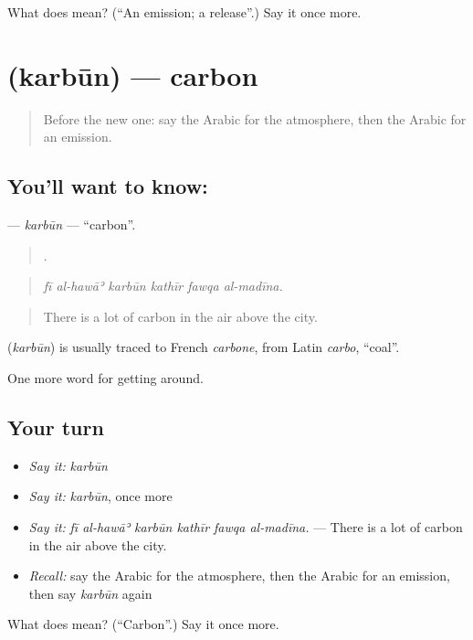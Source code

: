 \begin{tcolorbox}[breakable,colback=teal!4,colframe=teal!35!black,title={Before you move on}]
What does  mean? (\textquotedblleft{}An emission; a release\textquotedblright{}.) Say it once more.
\end{tcolorbox}
\section[\texorpdfstring{\ar{كربون} (karbūn)}{كربون (karbūn)}]{ (karbūn) — carbon}

\label{lesson:AR-C463-karbun}



\begin{quote}
Before the new one: say the Arabic for the atmosphere, then the Arabic for an emission.
\end{quote}

\subsection*{You'll want to know: }
\textbf{} — \emph{karbūn} — \textquotedblleft{}carbon\textquotedblright{}.

\begin{quote}
     .
\end{quote}

\begin{quote}
\emph{fī al-hawāʾ karbūn kathīr fawqa al-madīna.}
\end{quote}

\begin{quote}
There is a lot of carbon in the air above the city.
\end{quote}

\begin{cousinweb}
\textbf{} (\emph{karbūn}) is usually traced to French \emph{carbone}, from Latin \emph{carbo}, \textquotedblleft{}coal\textquotedblright{}.
\end{cousinweb}

\begin{grammarlens}[title={What you've built}]
One more word for getting around.
\end{grammarlens}

\subsection*{Your turn}
\begin{itemize}
\raggedright
  \item \emph{Say it:} \emph{karbūn}
  \item \emph{Say it:} \emph{karbūn}, once more
  \item \emph{Say it:} \emph{fī al-hawāʾ karbūn kathīr fawqa al-madīna.} — There is a lot of carbon in the air above the city.
  \item \emph{Recall:} say the Arabic for the atmosphere, then the Arabic for an emission, then say \emph{karbūn} again
\end{itemize}

\begin{tcolorbox}[breakable,colback=teal!4,colframe=teal!35!black,title={Before you move on}]
What does  mean? (\textquotedblleft{}Carbon\textquotedblright{}.) Say it once more.
\end{tcolorbox}
